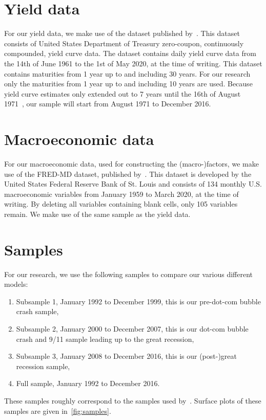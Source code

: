 \section{Yield data}
For our yield data, we make use of the dataset published by~\textcite{gurkaynak_us_2007}. 
This dataset consists of United States Department of Treasury zero-coupon, continuously compounded, yield curve data. 
The dataset contains daily yield curve data from the 14th of June 1961 to the 1st of May 2020, at the time of writing. 
This dataset contains maturities from 1 year up to and including 30 years. 
For our research only the maturities from 1 year up to and including 10 years are used. 
Because yield curve estimates only extended out to 7 years until the 16th of August 1971~\parencite[see][p.~19]{gurkaynak_us_2007}, our sample will start from August 1971 to December 2016. 

\section{Macroeconomic data}
For our macroeconomic data, used for constructing the (macro-)factors, we make use of the FRED-MD dataset, published by~\textcite{mccracken_fred-md_2016}. 
This dataset is developed by the United States Federal Reserve Bank of St. Louis and consists of 134 monthly U.S. macroeconomic variables from January 1959 to March 2020, at the time of writing. 
By deleting all variables containing blank cells, only 105 variables remain. 
We make use of the same sample as the yield data.

\section{Samples}
\label{sec:samples}
For our research, we use the following samples to compare our various different models:
\begin{enumerate}
	\item Subsample 1, January 1992 to December 1999, this is our pre-dot-com bubble crash sample,
	\item Subsample 2, January 2000 to December 2007, this is our dot-com bubble crash and 9/11 sample leading up to the great recession,
	\item Subsample 3, January 2008 to December 2016, this is our (post-)great recession sample,
	\item Full sample, January 1992 to December 2016.
\end{enumerate}
These samples roughly correspond to the samples used by~\textcite{swanson_big_2017}. Surface plots of these samples are given in~\cref{fig:samples}. 

